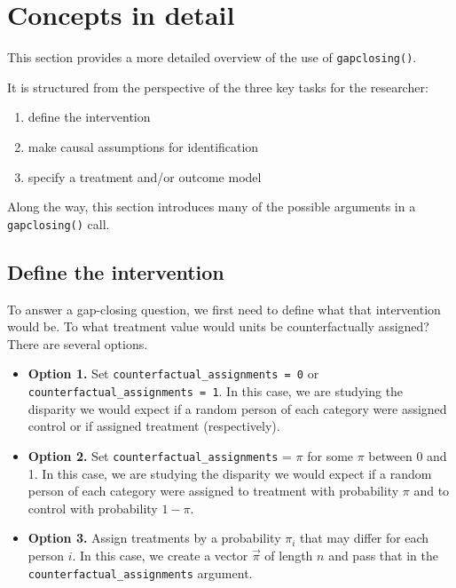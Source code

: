 \documentclass[
]{article}
\providecommand{\tightlist}{%
  \setlength{\itemsep}{0pt}\setlength{\parskip}{0pt}}
\begin{document}
\hypertarget{concepts-in-detail}{%
\section{Concepts in detail}\label{concepts-in-detail}}

This section provides a more detailed overview of the use of \texttt{gapclosing()}.

It is structured from the perspective of the three key tasks for the researcher:

\begin{enumerate}
\def\labelenumi{\arabic{enumi}.}
\tightlist
\item
  define the intervention
\item
  make causal assumptions for identification
\item
  specify a treatment and/or outcome model
\end{enumerate}

Along the way, this section introduces many of the possible arguments in a \texttt{gapclosing()} call.

\hypertarget{define-the-intervention}{%
\subsection{Define the intervention}\label{define-the-intervention}}

To answer a gap-closing question, we first need to define what that intervention would be. To what treatment value would units be counterfactually assigned? There are several options.

\begin{itemize}
\tightlist
\item
  \textbf{Option 1.} Set \texttt{counterfactual\_assignments\ =\ 0} or \texttt{counterfactual\_assignments\ =\ 1}. In this case, we are studying the disparity we would expect if a random person of each category were assigned control or if assigned treatment (respectively).
\item
  \textbf{Option 2.} Set \texttt{counterfactual\_assignments} = \(\pi\) for some \(\pi\) between 0 and 1. In this case, we are studying the disparity we would expect if a random person of each category were assigned to treatment with probability \(\pi\) and to control with probability \(1 - \pi\).
\item
  \textbf{Option 3.} Assign treatments by a probability \(\pi_i\) that may differ for each person \(i\). In this case, we create a vector \(\vec\pi\) of length \(n\) and pass that in the \texttt{counterfactual\_assignments} argument.
\end{itemize}
\end{document}
